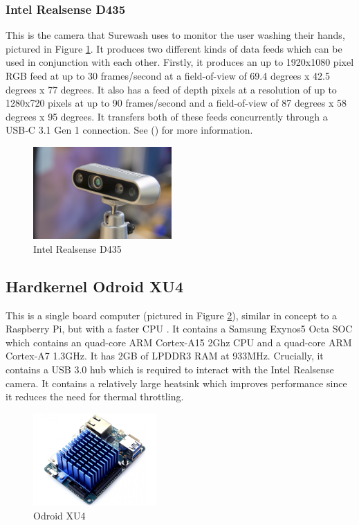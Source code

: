         \subsubsection{Intel Realsense D435}
        This is the camera that Surewash uses to monitor the user washing their hands, pictured in Figure \ref{fig:rs_cam}. It produces two different kinds of data feeds which can be used in conjunction with each other. Firstly, it produces an up to 1920x1080 pixel RGB feed at up to 30 frames/second at a field-of-view of 69.4 degrees x 42.5 degrees x 77 degrees. It also has a feed of depth pixels at a resolution of up to 1280x720 pixels at up to 90 frames/second and a field-of-view of 87 degrees x 58 degrees x 95 degrees. It transfers both of these feeds concurrently through a USB‑C 3.1 Gen 1 connection. See (\cite{d435}) for more information.
        \begin{figure}[h]
            \centering
            \includegraphics[height=100pt]{../img/rs_cam_2.jpg}
            \caption[]{Intel Realsense D435\footnotemark}
            \label{fig:rs_cam}
        \end{figure}

        \subsection{Hardkernel Odroid XU4}
        This is a single board computer (pictured in Figure \ref{fig:odroid}), similar in concept to a Raspberry Pi, but with a faster CPU \cite{odroid_xu4}. It contains a Samsung Exynos5 Octa SOC which contains an quad-core ARM Cortex-A15 2Ghz CPU and a quad-core ARM Cortex-A7 1.3GHz. It has 2GB of LPDDR3 RAM at 933MHz. Crucially, it contains a USB 3.0 hub which is required to interact with the Intel Realsense camera. It contains a relatively large heatsink which improves performance since it reduces the need for thermal throttling.

        \begin{figure}[h]
            \centering
            \includegraphics[height=100pt]{../img/odroid.jpg}
            \caption[]{Odroid XU4\footnotemark}
            \label{fig:odroid}
        \end{figure}
    
